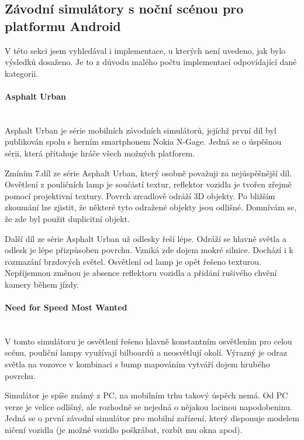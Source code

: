 \documentclass[11pt,twoside,a4paper]{book}
\begin{document}
\subsection{Závodní simulátory s noční scénou pro platformu Android}
V této sekci jsem vyhledával i implementace, u kterých není uvedeno, jak bylo výsledků dosaženo. Je to z důvodu malého počtu implementací odpovídající dané kategorii.

\paragraph{Asphalt Urban}\mbox{}\\

Asphalt Urban je série mobilních závodních simulátorů, jejíchž první díl byl publikován spolu s herním smartphonem Nokia N-Gage. Jedná se o úspěšnou sérii, která přitahuje hráče všech možných platforem.

Zmíním 7.díl ze série Asphalt Urban, který osobně považuji za nejúspěšnější díl. Osvětlení z pouličních lamp je součástí textur, reflektor vozidla je tvořen zřejmě pomocí projektivní textury. Povrch zrcadlově odráží 3D objekty. Po bližším zkoumání lze zjistit, že některé tyto odražené objekty jsou odlišné. Domnívám se, že zde byl použit duplicitní objekt.

Další díl ze série Asphalt Urban už odlesky řeší lépe. Odráží se hlavně světla a odlesk je lépe přizpůsoben povrchu. Vzniká zde dojem mokré silnice. Dochází i k rozmazání brzdových světel. Osvětlení od lamp je opět řešeno texturou. Nepříjemnou změnou je absence reflektoru vozidla a přidání rušivého chvění kamery během jízdy.

\paragraph{Need for Speed Most Wanted}\mbox{}\\

V tomto simulátoru je osvětlení řešeno hlavně konstantním osvětlením pro celou scénu, pouliční lampy využívají bilboardů a neosvětlují okolí. Výrazný je odraz světla na vozovce v kombinaci s bump mapováním vytváří dojem hrubého povrchu.

Simulátor je spíše známý z PC, na mobilním trhu takový úspěch nemá. Od PC verze je velice odlišný, ale rozhodně se nejedná o nějakou lacinou napodobeninu. Jedná se o první závodní simulátor pro mobilní zařízení, který disponuje modelem ničení vozidla (je možné vozidlo poškrábat, rozbít mu okna apod).
\end{document}
